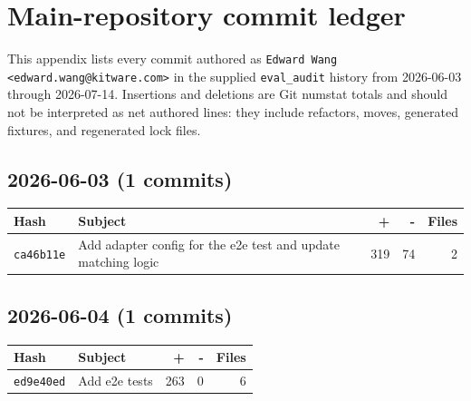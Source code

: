 \chapter{Main-repository commit ledger}\label{app:main-commit-ledger}
\small
This appendix lists every commit authored as \texttt{Edward Wang <edward.wang@kitware.com>} in the supplied \texttt{eval\_audit} history from 2026-06-03 through 2026-07-14. Insertions and deletions are Git numstat totals and should not be interpreted as net authored lines: they include refactors, moves, generated fixtures, and regenerated lock files.
\section*{2026-06-03 (1 commits)}
\begin{longtable}{@{}p{}p{}r r r@{}}
\toprule Hash & Subject & + & - & Files \\ \midrule\endhead
\texttt{ca46b11e} & Add adapter config for the e2e test and update matching logic & 319 & 74 & 2 \\
\bottomrule\end{longtable}
\section*{2026-06-04 (1 commits)}
\begin{longtable}{@{}p{}p{}r r r@{}}
\toprule Hash & Subject & + & - & Files \\ \midrule\endhead
\texttt{ed9e40ed} & Add e2e tests & 263 & 0 & 6 \\
\bottomrule\end{longtable}
